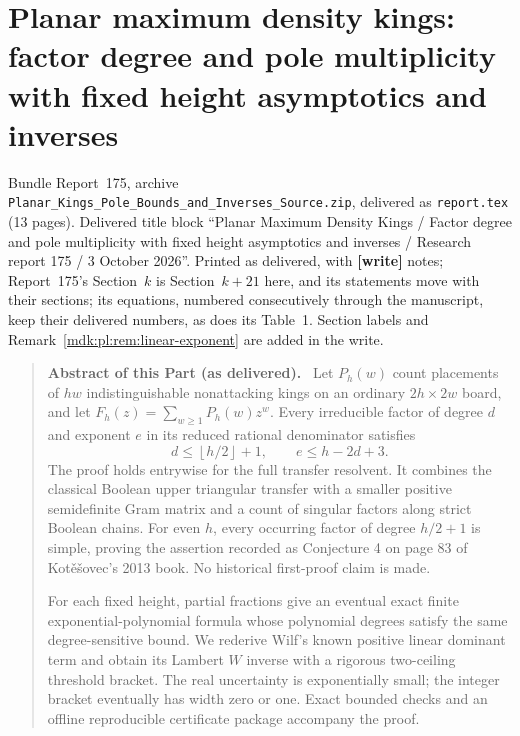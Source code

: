\documentclass[11pt,letterpaper]{article}
\numberwithin{equation}{section}
\theoremstyle{remark}\newtheorem{remark}[theorem]{Remark}
\newcommand{\floor}[1]{\left\lfloor #1\right\rfloor}
\newcommand{\file}[1]{\nolinkurl{#1}}
\newenvironment{partabstract}{\begin{quote}\small\noindent\textbf{Abstract of this Part (as delivered).}\ }{\end{quote}}
\newcommand{\partsource}[1]{\par\noindent\begin{minipage}{\textwidth}\small #1\end{minipage}\par\medskip}
\begin{document}
\part{Planar maximum density kings: factor degree and pole multiplicity with fixed height asymptotics and inverses}\label{mdk:pl:part}
\partsource{Bundle Report~175, archive \file{Planar_Kings_Pole_Bounds_and_Inverses_Source.zip}, delivered as \file{report.tex} (13 pages). Delivered title block ``Planar Maximum Density Kings / Factor degree and pole multiplicity with fixed height asymptotics and inverses / Research report 175 / 3 October 2026''. Printed as delivered, with \textbf{[write]} notes; Report~175's Section~$k$ is Section~$k+21$ here, and its statements move with their sections; its equations, numbered consecutively through the manuscript, keep their delivered numbers, as does its Table~1. Section labels and Remark~\ref{mdk:pl:rem:linear-exponent} are added in the write.}
\begin{partabstract}
Let $P_h(w)$ count placements of $hw$ indistinguishable nonattacking kings on an ordinary $2h\times2w$ board, and let $F_h(z)=\sum_{w\ge1}P_h(w)z^w$. Every irreducible factor of degree $d$ and exponent $e$ in its reduced rational denominator satisfies
\[
 d\le\floor{h/2}+1,\qquad e\le h-2d+3.
\]
The proof holds entrywise for the full transfer resolvent. It combines the classical Boolean upper triangular transfer with a smaller positive semidefinite Gram matrix and a count of singular factors along strict Boolean chains. For even $h$, every occurring factor of degree $h/2+1$ is simple, proving the assertion recorded as Conjecture 4 on page 83 of Kot\v e\v sovec's 2013 book. No historical first-proof claim is made.

For each fixed height, partial fractions give an eventual exact finite exponential-polynomial formula whose polynomial degrees satisfy the same degree-sensitive bound. We rederive Wilf's known positive linear dominant term and obtain its Lambert $W$ inverse with a rigorous two-ceiling threshold bracket. The real uncertainty is exponentially small; the integer bracket eventually has width zero or one. Exact bounded checks and an offline reproducible certificate package accompany the proof.
\end{partabstract}
\end{document}

